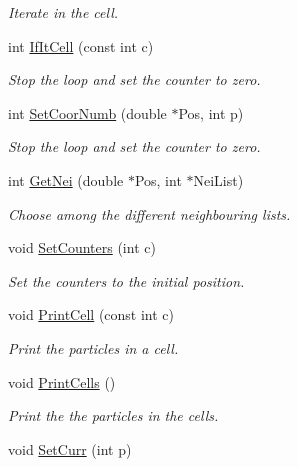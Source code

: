 \begin{DoxyCompactItemize}
\begin{DoxyCompactList}\small\item\em \-Iterate in the cell. \end{DoxyCompactList}\item 
int \hyperlink{classDdDoubleLoop_a7389c3097a5406135ae60ac38ad141f5}{\-If\-It\-Cell} (const int c)
\begin{DoxyCompactList}\small\item\em \-Stop the loop and set the counter to zero. \end{DoxyCompactList}\item 
int \hyperlink{classDdDoubleLoop_ab8ed71a5fc65abc128da0367f93803c1}{\-Set\-Coor\-Numb} (double $\ast$\-Pos, int p)
\begin{DoxyCompactList}\small\item\em \-Stop the loop and set the counter to zero. \end{DoxyCompactList}\item 
\hypertarget{classDdDoubleLoop_afe0e4e9746cdae570f8c1efdfd04ac16}{int \hyperlink{classDdDoubleLoop_afe0e4e9746cdae570f8c1efdfd04ac16}{\-Get\-Nei} (double $\ast$\-Pos, int $\ast$\-Nei\-List)}\label{classDdDoubleLoop_afe0e4e9746cdae570f8c1efdfd04ac16}

\begin{DoxyCompactList}\small\item\em \-Choose among the different neighbouring lists. \end{DoxyCompactList}\item 
void \hyperlink{classDdDoubleLoop_aadd6f477626e28e8284b9db4649e841d}{\-Set\-Counters} (int c)
\begin{DoxyCompactList}\small\item\em \-Set the counters to the initial position. \end{DoxyCompactList}\item 
void \hyperlink{classDdDoubleLoop_af5188eb0e6caae79f8bf349bf2345cf2}{\-Print\-Cell} (const int c)
\begin{DoxyCompactList}\small\item\em \-Print the particles in a cell. \end{DoxyCompactList}\item 
void \hyperlink{classDdDoubleLoop_a1132024d8fdd721fd6a36781d4235162}{\-Print\-Cells} ()
\begin{DoxyCompactList}\small\item\em \-Print the the particles in the cells. \end{DoxyCompactList}\item 
\hypertarget{classDdDoubleLoop_a74b7b0d716684a7d46993c83795fd9e7}{void \hyperlink{classDdDoubleLoop_a74b7b0d716684a7d46993c83795fd9e7}{\-Set\-Curr} (int p)}\label{classDdDoubleLoop_a74b7b0d716684a7d46993c83795fd9e7}


\end{DoxyCompactItemize}
